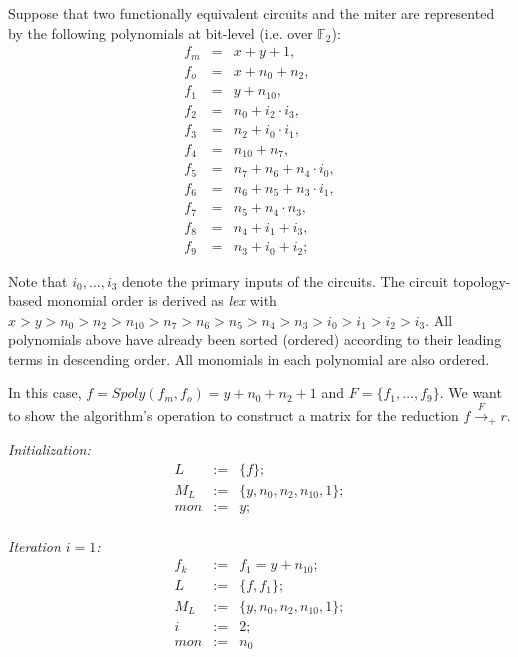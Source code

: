 \begin{Example}\label{exp:consmatix}
	Suppose that two functionally equivalent circuits and the
        miter are  represented by the following polynomials at
        bit-level (i.e. over $\mathbb{F}_2$):
	\begin{eqnarray}
		f_m&=&x+y+1, \nonumber \\
		f_o&=&x+n_0+n_2, \nonumber \\
		f_1&=&y+n_{10}, \nonumber \\
		f_2&=&n_0+i_2\cdot i_3, \nonumber \\
		f_3&=&n_2+i_0\cdot i_1, \nonumber \\
		f_4&=&n_{10}+n_7, \nonumber \\
		f_{5}&=&n_7+n_6+n_4\cdot i_0, \nonumber \\
		f_{6}&=&n_6+n_5+n_3\cdot i_1, \nonumber \\
		f_{7}&=&n_5+n_4\cdot n_3,  \nonumber \\
		f_{8}&=&n_4+i_1+i_3, \nonumber \\
		f_{9}&=&n_3+i_0+i_2;\nonumber 
	\end{eqnarray}
	
        Note that $i_0, \dots, i_3$ denote the primary inputs of the
        circuits. The circuit topology-based monomial order is derived
        as {\it lex} with
        $x>y>n_0>n_2>n_{10}>n_7>n_6>n_5>n_4>n_3>i_0>i_1>i_2>i_3$. 
	All polynomials above have already been sorted (ordered) according to their
        leading terms in descending order. All monomials in each
        polynomial are also ordered. 
	
	In this case, $f=Spoly(f_{m},f_{o})=y+n_0+n_2+1$ and
        $F=\{f_{1},\dots, f_{9}\}$.  We want to show the algorithm's
        operation to construct a matrix for the reduction $f
        \xrightarrow{F}_{+}r$.  
	
		
	{\it Initialization:}
	\begin{eqnarray}
		L&:=&\{f\}; \nonumber \\
		M_{L}&:=&\{ y,n_0,n_2,n_{10},1\}; \nonumber \\
		mon&:=& y ;\nonumber
	\end{eqnarray}\\
	
	{\it Iteration $i=1$:}	
	\begin{eqnarray}
		f_{k}&:=&f_{1}=y+n_{10}; \nonumber \\
		L&:=&\{f,f_1\}; \nonumber \\
		M_{L}&:=&\{ y,n_0,n_2,n_{10},1\}; \nonumber \\
		i&:=&2;  \nonumber \\
		mon&:=& n_0\nonumber 
	\end{eqnarray}\\
	

\end{Example}
